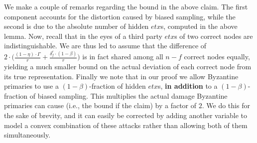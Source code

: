 We make a couple of remarks regarding the bound in the above claim. The first component accounts for the distortion caused by biased sampling, while the second is due to the absolute number of hidden $etx$s, computed in the above lemma. Now, recall that in the eyes of a third party $etx$s of two correct nodes are indistinguishable. We are thus led to assume that the difference of $2\cdot\big(\frac{(1-\eta)\cdot\Gamma}{r}+\frac{\delta_f^r\cdot (1-\beta)}{r}\big)$ is in fact shared among all $n-f$ correct nodes equally, yielding a much smaller bound on the actual deviation of each correct node from its true representation. Finally we note that in our proof we allow Byzantine primaries to use a $(1-\beta)$-fraction of hidden $etx$s, \textbf{in addition} to a $(1-\beta)$-fraction of biased sampling. This multiplies the actual damage Byzantine primaries can cause (i.e., the bound if the claim) by a factor of $2$. We do this for the sake of brevity, and it can easily be corrected by adding another variable to model a convex combination of these attacks rather than allowing both of them simultaneously.
 
